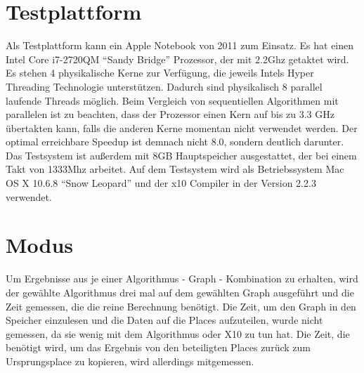 \section{Testplattform} %
\label{sec:testplattform}
Als Testplattform kann ein Apple Notebook von 2011 zum Einsatz. Es hat einen Intel Core i7-2720QM \enquote{Sandy Bridge} Prozessor, der mit 2.2Ghz getaktet wird. Es stehen 4 physikalische Kerne zur Verfügung, die jeweils Intels Hyper Threading Technologie unterstützen. Dadurch sind physikalisch 8 parallel laufende Threads möglich. Beim Vergleich von sequentiellen Algorithmen mit parallelen ist zu beachten, dass der Prozessor einen Kern auf bis zu 3.3 GHz übertakten kann, falls die anderen Kerne momentan nicht verwendet werden. Der optimal erreichbare Speedup ist demnach nicht 8.0, sondern deutlich darunter. Das Testsystem ist außerdem mit 8GB Hauptspeicher ausgestattet, der bei einem Takt von 1333Mhz arbeitet. Auf dem Testsystem wird als Betriebssystem Mac OS X 10.6.8 \enquote{Snow Leopard} und der x10 Compiler in der Version 2.2.3 verwendet.

\section{Modus} %
\label{sec:modus}
Um Ergebnisse aus je einer Algorithmus - Graph - Kombination zu erhalten, wird der gewählte Algorithmus drei mal auf dem gewählten Graph ausgeführt und die Zeit gemessen, die die reine Berechnung benötigt. Die Zeit, um den Graph in den Speicher einzulesen und die Daten auf die Places aufzuteilen, wurde nicht gemessen, da sie wenig mit dem Algorithmus oder X10 zu tun hat. Die Zeit, die benötigt wird, um das Ergebnis von den beteiligten Places zurück zum Ursprungsplace zu kopieren, wird allerdings mitgemessen.

